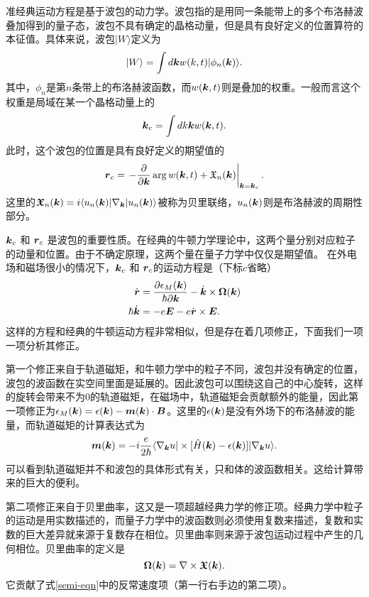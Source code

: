 准经典运动方程是基于波包的动力学。波包指的是用同一条能带上的多个布洛赫波叠加得到的量子态，波包不具有确定的晶格动量，但是具有良好定义的位置算符的本征值。具体来说，波包$|W\rangle$定义为
\begin{equation}
|W\rangle=\int d\boldsymbol{k} w(k, t)|\phi_n(\boldsymbol{k})\rangle.
\end{equation}
其中，$\phi_n$是第$n$条带上的布洛赫波函数，而$w(\boldsymbol{k},t)$则是叠加的权重。一般而言这个权重是局域在某一个晶格动量上的
\begin{equation}
\boldsymbol{k}_c = \int dk \boldsymbol{k} w(\boldsymbol{k},t).
\end{equation}
此时，这个波包的位置是具有良好定义的期望值的
\begin{equation}
\boldsymbol{r}_c = \left. -\frac{\partial}{\partial \boldsymbol{k}} \arg w(\boldsymbol{k}, t) + \mathfrak{X}_n(\boldsymbol{k})\right|_{\boldsymbol{k}=\boldsymbol{k}_c}.\label{semi-rc}
\end{equation}
这里的$\boldsymbol{\mathfrak{X}}_n(\boldsymbol{k})=i \langle u_n(\boldsymbol{k})|\nabla_{\boldsymbol{k}}|u_n(\boldsymbol{k}) \rangle$被称为贝里联络，$u_n(\boldsymbol{k})$则是布洛赫波的周期性部分。

$\boldsymbol{k}_c$ 和 $\boldsymbol{r}_c$ 是波包的重要性质。在经典的牛顿力学理论中，这两个量分别对应粒子的动量和位置。由于不确定原理，这两个量在量子力学中仅仅是期望值。 在外电场和磁场很小的情况下，$\boldsymbol{k}_c$ 和 $\boldsymbol{r}_c$的运动方程是（下标$c$省略）
\begin{align}
	\dot{\boldsymbol{r}} &= \frac{\partial \epsilon_M(\boldsymbol{k})}{\hbar\partial \boldsymbol{k}}-\dot{\boldsymbol{k}}\times\boldsymbol{\Omega}(\boldsymbol{k})\nonumber\\
	\hbar\dot{\boldsymbol{k}} &= -e\boldsymbol{E}-e\dot{\boldsymbol{r}}\times\boldsymbol{E}.\label{semi-eqn}
\end{align}
这样的方程和经典的牛顿运动方程非常相似，但是存在着几项修正，下面我们一项一项分析其修正。

第一个修正来自于轨道磁矩，和牛顿力学中的粒子不同，波包并没有确定的位置，波包的波函数在实空间里面是延展的。因此波包可以围绕这自己的中心旋转，这样的旋转会带来不为0的轨道磁矩，在磁场中，轨道磁矩会贡献额外的能量，因此第一项修正为$\epsilon_M(\boldsymbol{k})=\epsilon(\boldsymbol{k})-\boldsymbol{m}(\boldsymbol{k})\cdot\boldsymbol{B}$。这里的$\epsilon(\boldsymbol{k})$是没有外场下的布洛赫波的能量，而轨道磁矩的计算表达式为
\begin{equation}
\boldsymbol{m}(\boldsymbol{k}) = -i\frac{e}{2\hbar}\langle\nabla_{\boldsymbol{k}}u|\times [\hat{H}(\boldsymbol{k})-\epsilon(\boldsymbol{k})]|\nabla_{\boldsymbol{k}}u\rangle.
\end{equation}
可以看到轨道磁矩并不和波包的具体形式有关，只和体的波函数相关。这给计算带来的巨大的便利。

第二项修正来自于贝里曲率，这又是一项超越经典力学的修正项。经典力学中粒子的运动是用实数描述的，而量子力学中的波函数则必须使用复数来描述，复数和实数的巨大差异就来源于复数存在相位。贝里曲率则来源于波包运动过程中产生的几何相位。贝里曲率的定义是
\begin{equation}
\boldsymbol{\Omega}(\boldsymbol{k}) = \nabla\times\boldsymbol{\mathfrak{X}}(\boldsymbol{k}).
\end{equation}
它贡献了式\ref{semi-eqn}中的反常速度项（第一行右手边的第二项）。

